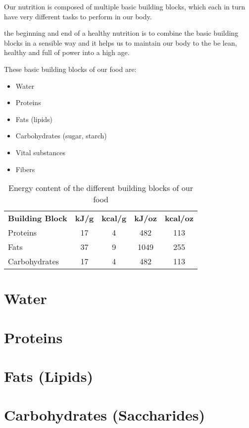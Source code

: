 \documentclass[../main.tex]{subfiles}
\begin{document}
Our nutrition is composed of multiple basic building blocks, which each in turn have very different
tasks to perform in our body.

the beginning and end of a healthy nutrition is to combine the basic building blocks in a sensible way and it helps us
to maintain our body to the be lean, healthy and full of power into a high age.

These basic building blocks of our food are:
\begin{itemize}
\item Water
\item Proteins
\item Fats (lipids)
\item Carbohydrates (sugar, starch)
\item Vital substances
\item Fibers
\end{itemize}

\begin{table}[htb!]
  \centering
  \begin{tabular}{lcccc}
    \textbf{Building Block} & \textbf{kJ/g} & \textbf{kcal/g} & \textbf{kJ/oz} & \textbf{kcal/oz} \\
    Proteins & 17 & 4 & 482 & 113 \\
    Fats & 37 & 9 & 1049 & 255 \\
    Carbohydrates & 17 & 4 & 482 & 113 \\
  \end{tabular}
  \caption{Energy content of the different building blocks of our food}
\end{table}

\section{Water}



\section{Proteins}



\section{Fats (Lipids)}



\section{Carbohydrates (Saccharides)}
\end{document}
